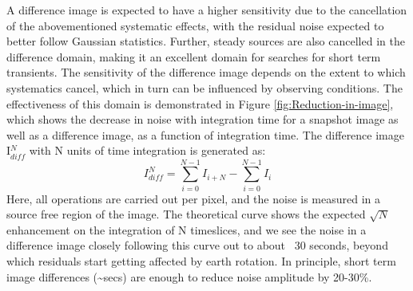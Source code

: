 \documentclass{aa}
\begin{document}
A  difference  image  is expected  to  have  a  higher  sensitivity due  to  the
cancellation of  the abovementioned systematic effects, with  the residual noise
expected to better follow Gaussian statistics.  Further, steady sources are also
cancelled in the  difference domain, making it an  excellent domain for searches
for short term  transients.  The sensitivity of the  difference image depends on
the  extent to  which systematics  cancel, which  in turn  can be  influenced by
observing  conditions.  The  effectiveness  of this  domain  is demonstrated  in
Figure  \ref{fig:Reduction-in-image}, which  shows  the decrease  in noise  with
integration  time for  a snapshot  image as  well as  a difference  image,  as a
function of  integration time.  The
difference image I$^N_{diff}$ with N units of time integration is generated as:
\begin{equation}
I^N_{diff} = \sum\limits_{i=0}^{N-1} I_{i+N} - \sum\limits_{i=0}^{N-1} I_i \label{eq:diff_img}
\end{equation}
Here, all operations are  carried out per pixel, and the noise  is measured in a
source  free region  of the  image.  The  theoretical curve  shows  the expected
$\sqrt{N}$ enhancement on the integration of  N timeslices, and we see the noise
in a  difference image closely  following this curve  out to about  ~30 seconds,
beyond which residuals start getting  affected by earth rotation.  In principle,
short term image differences  (\textasciitilde{}secs) are enough to reduce noise
amplitude by 20-30\%.
\end{document}
